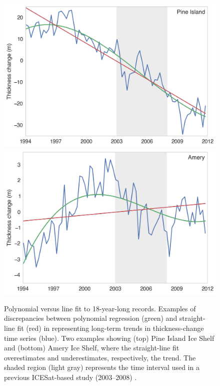 \begin{figure}[!h]
  \centering
  \includegraphics[width=.74\textwidth]{img/ts_pig_v2.png}\\
  \includegraphics[width=.74\textwidth]{img/ts_amery_v2.png}
  \caption[Polynomial versus line fit to 18-year-long records]{
  \ssp \footnotesize
Polynomial versus line fit to 18-year-long records. Examples of discrepancies between polynomial regression (green) and straight-line fit (red) in representing long-term trends in thickness-change time series (blue). Two examples showing (top) Pine Island Ice Shelf and (bottom) Amery Ice Shelf, where the straight-line fit overestimates and underestimates, respectively, the trend. The shaded region (light gray) represents the time interval used in a previous ICESat-based study (2003--2008) \parencite{Pritchard2012}.
  }
  \label{c3f7}
\end{figure}


